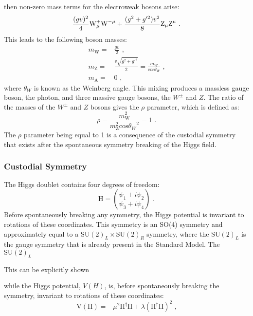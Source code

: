 %
\noindent then non-zero mass terms for the electroweak bosons arise:
%
\begin{equation}
\frac{(gv)^{2}}{4} \text{W}^{+}_{\mu} \text{W}^{-\mu} + \frac{(g^{2} + g'^{2})v^{2}}{8} \text{Z}_{\mu} \text{Z}^{\mu} \text{ .}\\
\end{equation}
%
\noindent This leads to the following boson masses:
%
\begin{equation}
\begin{aligned}
m_{\text{W}} = & \frac{gv}{2} \text{ ,} \\
m_{\text{Z}} = & \frac{v\sqrt{g^{2} + g'^{2}}}{2} = \frac{m_{W}}{\text{cos}{\theta_{W}}} \text{ ,} \\
m_{\text{A}} = & 0 \text{ ,}
\end{aligned}
\end{equation}
%
\noindent where $\theta_{W}$ is known as the Weinberg angle.  This mixing produces a massless gauge boson, the photon, and three massive gauge bosons, the $W^{\pm}$ and $Z$.  The ratio of the masses of the $W^{\pm}$ and $Z$ bosons gives the $\rho$ parameter, which is defined as:
%
\begin{equation}
\rho = \frac{m_{\text{W}}^{2}}{m_{\text{Z}}^{2}\text{cos}{\theta_{W}}^{2}} = 1\text{ .}
\label{equ:custodialsymmetry}
\end{equation}
%
\noindent The $\rho$ parameter being equal to 1 is a consequence of the custodial symmetry that exists after the spontaneous symmetry breaking of the Higgs field.  


\subsubsection{Custodial Symmetry}
The Higgs doublet contains four degrees of freedom:
%
\begin{equation}
\text{H} = \binom{\psi_{1} + i\psi_{2}}{\psi_{3} + i\psi_{4}} \text{ .}
\end{equation}
%
\noindent Before spontaneously breaking any symmetry, the Higgs potential is invariant to rotations of these coordinates.  This symmetry is an SO(4) symmetry and approximately equal to a $\text{SU}(2)_{L} \times \text{SU}(2)_{R}$ symmetry, where the $\text{SU}(2)_{L}$ is the gauge symmetry that is already present in the Standard Model.  The $\text{SU}(2)_{L}$

This can be explicitly shown 

while the Higgs potential, $V(H)$, is, before spontaneously breaking the symmetry, invariant to rotations of these coordinates:
%
\begin{equation}
\text{V}(\text{H}) = -\mu^{2}\text{H}^{\dagger}\text{H} + \lambda (\text{H}^{\dagger}\text{H})^{2} \text{ ,}
\end{equation}
%


